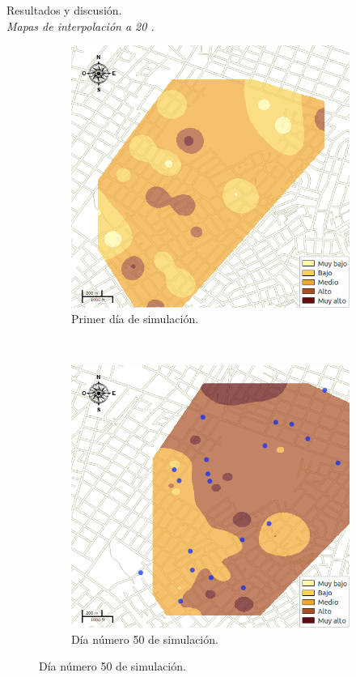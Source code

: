 \begin{frame}[t]{Resultados y discusión.\\\textit{Mapas de interpolación a 20 \textcelsius.}}
    \begin{figure}
    \begin{subfigure}[b]{0.45\textwidth}
        \includegraphics[width=\textwidth]{../book/capitulo-6/graphics/raster/temp-20-0.png}
        \caption{ Primer día de simulación.}
    \end{subfigure}
    ~~~~
    \begin{subfigure}[b]{0.45\textwidth}
        \includegraphics[width=\textwidth]{../book/capitulo-6/graphics/raster/temp-20-38.png}
        \caption{Día número 50 de simulación.}
    \end{subfigure}
    \end{figure}
\end{frame}


